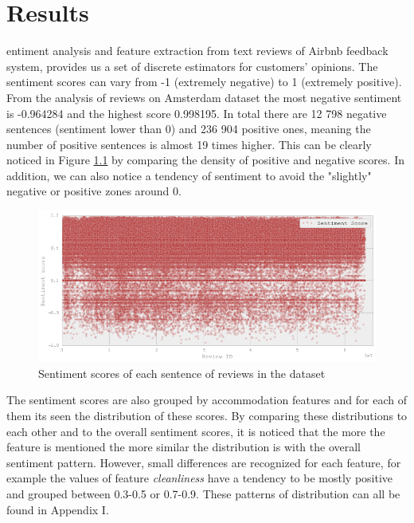 %
%
\let\textcircled=\pgftextcircled
\chapter{Results}
\label{chap:res}
entiment analysis and feature extraction from text reviews of Airbnb feedback system, provides us a set of discrete estimators for customers' opinions. The sentiment scores can vary from -1 (extremely negative) to 1 (extremely positive). From the analysis of reviews on Amsterdam dataset the most negative sentiment is -0.964284 and the highest score 0.998195. In total there are 12 798 negative sentences (sentiment lower than 0) and 236 904 positive ones, meaning the number of positive sentences is almost 19 times higher. This can be clearly noticed in Figure \ref{fig:sent} by comparing the density of positive and negative scores. In addition, we can also notice a tendency of sentiment to avoid the "slightly" negative or positive zones around 0.
\begin{figure}[h!]
\centering
	\includegraphics[height=0.24\textheight]{sentiment}
	\caption{Sentiment scores of each sentence of reviews in the dataset}
	\label{fig:sent}
\end{figure}
The sentiment scores are also grouped by accommodation features and for each of them its seen the distribution of these scores. By comparing these distributions to each other and to the overall sentiment scores, it is noticed that the more the feature is mentioned the more similar the distribution is with the overall sentiment pattern. However, small differences are recognized for each feature, for example the values of feature \textit{cleanliness} have a tendency to be mostly positive and grouped between 0.3-0.5 or 0.7-0.9. These patterns of distribution can all be found in Appendix I.

